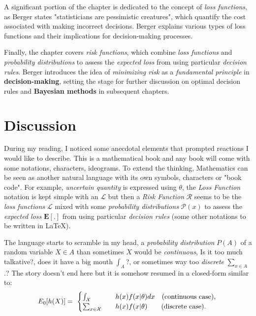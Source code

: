 \documentclass{article} %
\begin{document}
\vspace{.1cm}

A significant portion of the chapter is dedicated to the concept of \textit{loss functions}, as Berger states "statisticians are pessimistic creatures", which quantify the cost associated with making incorrect decisions. Berger explains various types of loss functions and their implications for decision-making processes.

\vspace{.1cm}

Finally, the chapter covers \textit{risk functions}, which combine \textit{loss functions} and \textit{probability distributions} to assess the \textit{expected loss} from using particular \textit{decision rules}. Berger introduces the idea of \textit{minimizing risk} as a \textit{fundamental principle} in \textbf{decision-making}, setting the stage for further discussion on optimal decision rules and \textbf{Bayesian methods} in subsequent chapters.

    \section{Discussion} %
    
    During my reading, I noticed some anecdotal elements that prompted reactions I would like to describe. This is a mathematical book and any book will come with some notations, characters, ideograms. To extend the thinking, Mathematics can be seen as another natural language with its own symbols, characters or "book code". For example, \textit{uncertain quantity} is expressed using $\theta$, the \textit{Loss Function} notation is kept simple with an $\mathcal{L}$ but then a \textit{Risk Function} $\mathcal{R}$ seems to be the \textit{loss functions} $\mathcal{L}$ mixed with some \textit{probability distributions} $\mathcal{P}(x)$ to assess the \textit{expected loss} $\mathbf{E}[.]$ from using particular \textit{decision rules} (some other notations to be written in LaTeX).

\vspace{.1cm}
    
    The language starts to scramble in my head, a \textit{probability distribution} $\mathit{P}(A)$ of a random variable $X \in A$ than sometimes $X$ would be \textit{continuous}, Is it too much talkative?, does it have a big mouth $\int_A$?, or sometimes way too \textit{discrete} $\sum_{x \in A}$.? The story doesn't end here but it is somehow resumed in a closed-form similar to:
    $$
    E_0[h(X)] = \
      \begin{cases}
        \int_{\mathcal{X}}  		& \quad h(x)f(x|\theta) dx \quad \text{(continuous case)}, \\
        \sum_{x \in \mathcal{X}}    & \quad h(x)f(x|\theta)    \qquad \text{(discrete case)}.
      \end{cases} \\
    $$
    
\end{document}
